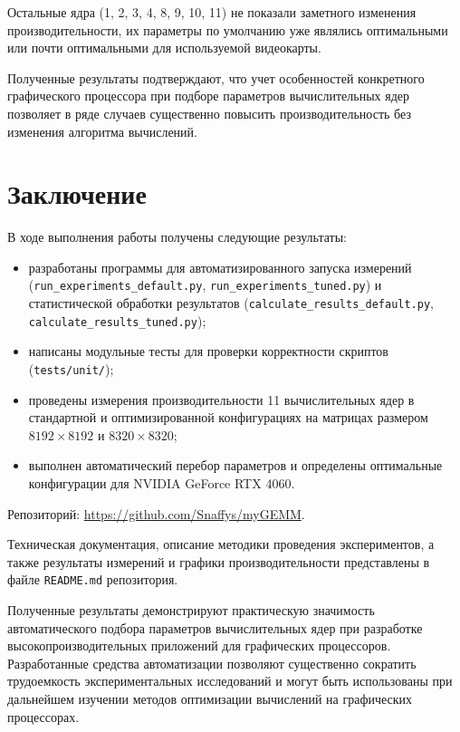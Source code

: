 \documentclass[a4paper]{article}
\begin{document}
Остальные ядра (1, 2, 3, 4, 8, 9, 10, 11) не показали заметного изменения производительности, их параметры по умолчанию уже являлись оптимальными или почти оптимальными для используемой видеокарты.

Полученные результаты подтверждают, что учет особенностей конкретного графического процессора при подборе параметров вычислительных ядер позволяет в ряде случаев существенно повысить производительность без изменения алгоритма вычислений.

\section{Заключение}

В ходе выполнения работы получены следующие результаты:

\begin{itemize}
    \item разработаны программы для автоматизированного запуска измерений (\texttt{run\_experiments\_default.py}, \texttt{run\_experiments\_tuned.py}) и статистической обработки результатов (\texttt{calculate\_results\_default.py}, \texttt{calculate\_results\_tuned.py});
    \item написаны модульные тесты для проверки корректности скриптов (\texttt{tests/unit/});
    \item проведены измерения производительности 11 вычислительных ядер в стандартной и оптимизированной конфигурациях на матрицах размером \(8192 \times 8192\) и \(8320 \times 8320\);
    \item выполнен автоматический перебор параметров и определены оптимальные конфигурации для NVIDIA GeForce RTX 4060.
\end{itemize}

Репозиторий: \url{https://github.com/Snaffys/myGEMM}.

Техническая документация, описание методики проведения экспериментов, а также результаты измерений и графики производительности представлены в файле \texttt{README.md} репозитория.

Полученные результаты демонстрируют практическую значимость автоматического подбора параметров вычислительных ядер при разработке высокопроизводительных приложений для графических процессоров. Разработанные средства автоматизации позволяют существенно сократить трудоемкость экспериментальных исследований и могут быть использованы при дальнейшем изучении методов оптимизации вычислений на графических процессорах.
\end{document}
